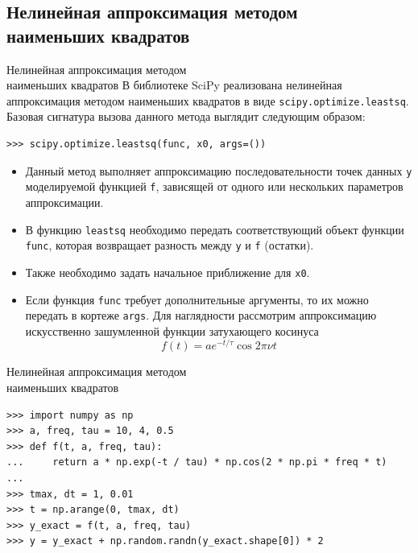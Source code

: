 \documentclass[aspectratio=169, mathserif]{beamer}	%
\begin{document}
\subsection{Нелинейная аппроксимация методом \\ наименьших квадратов}
\begin{frame}[fragile, label=c]{Нелинейная аппроксимация методом \\ наименьших квадратов}
\scriptsize
В библиотеке SciPy реализована нелинейная аппроксимация методом наименьших квадратов в виде  \texttt{scipy.optimize.leastsq}. Базовая сигнатура вызова данного метода выглядит следующим образом:
\vfill
\begin{verbatim}
>>> scipy.optimize.leastsq(func, x0, args=())
\end{verbatim}
\vfill
\begin{itemize}
	\item Данный метод выполняет аппроксимацию последовательности точек данных \texttt{y} моделируемой функцией \texttt{f}, зависящей от одного или нескольких параметров аппроксимации.
	\item В функцию \texttt{leastsq} необходимо передать соответствующий объект функции \texttt{func}, которая возвращает разность между \texttt{y} и \texttt{f} (остатки).
	\item Также необходимо задать начальное приближение для \texttt{x0}.
	\item Если функция \texttt{func} требует дополнительные аргументы, то их можно передать в кортеже \texttt{args}.
	Для наглядности рассмотрим аппроксимацию искусственно зашумленной функции затухающего косинуса
\vfill
$$
	f(t) = ae^{-t/\tau}\cos2\pi\nu t
$$
\end{itemize}
\vfill
\end{frame}

\begin{frame}[fragile, label=c]{Нелинейная аппроксимация методом \\ наименьших квадратов}
\scriptsize
\begin{verbatim}
>>> import numpy as np
>>> a, freq, tau = 10, 4, 0.5
>>> def f(t, a, freq, tau):
...     return a * np.exp(-t / tau) * np.cos(2 * np.pi * freq * t)
...
>>> tmax, dt = 1, 0.01
>>> t = np.arange(0, tmax, dt)
>>> y_exact = f(t, a, freq, tau)
>>> y = y_exact + np.random.randn(y_exact.shape[0]) * 2
\end{verbatim}
\vfill
\end{frame}
\end{document}

